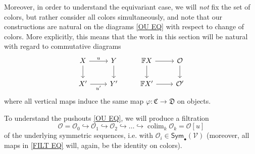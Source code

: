 \documentclass[a4paper,10pt
,draft
]{article}%
\numberwithin{equation}{section}
\numberwithin{figure}{section}
\theoremstyle{definition} %
\newcommand{\into}{\hookrightarrow}%
\DeclareMathOperator{\colim}{colim}%
\renewcommand{\O}{\ensuremath{\mathcal O}}
\newcommand{\1}{\ensuremath{\mathbbm 1}}%
\begin{document}
Moreover, in order to understand the equivariant case, 
we will \emph{not} fix the set of colors,  
but rather consider all colors simultaneously, 
and note that our constructions are natural 
on the diagrams \eqref{OU EQ} with respect to change of colors.
More explicitly, this means that the work in this section will be natural with regard to commutative diagrams
\begin{equation}\label{COLORCHNAT EQ}
\begin{tikzcd}
X \arrow[r, "u"',swap] \arrow[d]
&
Y \arrow[d]
&
\mathbb F X \arrow[d] \arrow[r]
&
\O \arrow[d]
\\
X' \arrow[r, "u'"']
&
Y'
&
\mathbb F X' \arrow[r]
&
\O'
\end{tikzcd}
\end{equation}
where all vertical maps induce the same map 
$\varphi \colon \mathfrak{C} \to \mathfrak{D}$ on objects.


To understand the pushouts \eqref{OU EQ},
we will produce a filtration
\begin{equation}\label{FILT EQ}
\O = \O_0 \into \O_1 \into \O_2 \into \dots \into \colim_k \O_k = \O[u]
\end{equation}
of the underlying symmetric sequences, i.e. with 
$\mathcal{O}_i \in \mathsf{Sym}_{\bullet}(\mathcal{V})$
(moreover, all maps in \eqref{FILT EQ} will, again, be the identity on colors).
\end{document}
